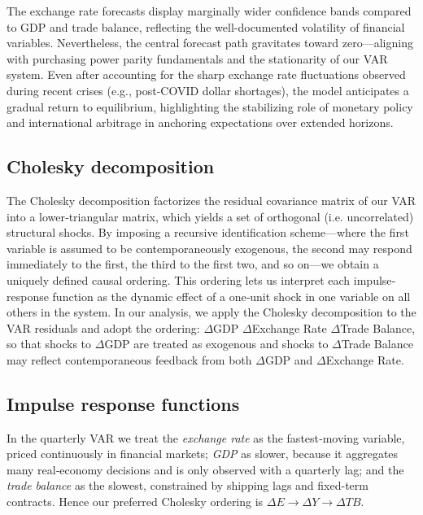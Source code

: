 \documentclass[
]{article}
\begin{document}
	The exchange rate forecasts display marginally wider confidence bands compared 
	to GDP and trade balance, reflecting the well-documented volatility of financial 
	variables. Nevertheless, the central forecast path gravitates toward 
	zero—aligning with purchasing power parity fundamentals and the stationarity of 
	our VAR system. Even after accounting for the sharp exchange rate fluctuations 
	observed during recent crises (e.g., post-COVID dollar shortages), the model 
	anticipates a gradual return to equilibrium, highlighting the stabilizing role 
	of monetary policy and international arbitrage in anchoring expectations over extended horizons.
	
	\subsection{Cholesky decomposition}
	
	The Cholesky decomposition factorizes the residual covariance matrix of our 
	VAR into a lower‐triangular matrix, which yields a set of orthogonal
	(i.e. uncorrelated) structural shocks. By imposing a recursive identification
	scheme—where the first variable is assumed to be contemporaneously exogenous, 
	the second may respond immediately to the first, the third to the first two,
	and so on—we obtain a uniquely defined causal ordering. This ordering lets us 
	interpret each impulse‐response function as the dynamic effect of a one‐unit 
	shock in one variable on all others in the system. In our analysis, we apply 
	the Cholesky decomposition to the VAR residuals and adopt the 
	ordering: $\Delta$GDP \textrightarrow $\Delta$Exchange Rate \textrightarrow $\Delta$Trade Balance, 
	so that shocks to  $\Delta$GDP are treated as exogenous and shocks to $\Delta$Trade Balance 
	may reflect contemporaneous feedback from both $\Delta$GDP and $\Delta$Exchange Rate.
	
	\subsection{Impulse response functions}
	In the quarterly VAR we treat the \emph{exchange rate} as the fastest‐moving
	variable, priced continuously in financial markets; \emph{GDP} as slower,
	because it aggregates many real‐economy decisions and is only observed with a
	quarterly lag; and the \emph{trade balance} as the slowest, constrained by
	shipping lags and fixed-term contracts.  Hence our preferred Cholesky ordering
	is $\Delta E \rightarrow \Delta Y \rightarrow \Delta TB$.
	
\end{document}
